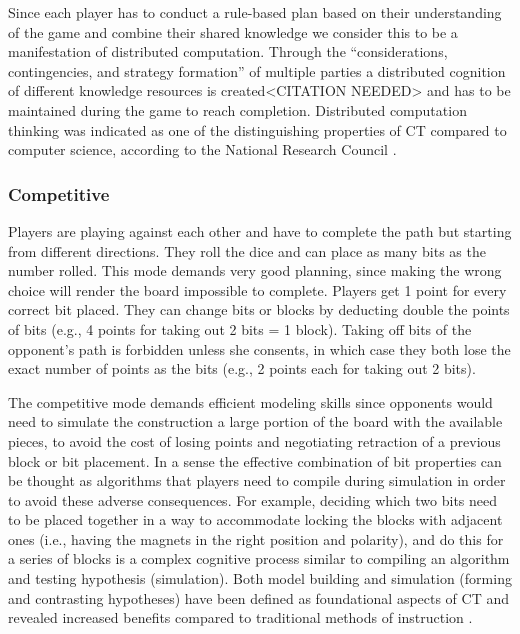 \documentclass{acm_proc_article-sp}
\begin{document}
Since each player has to conduct a rule-based plan based on their understanding of the game and combine their shared knowledge we consider this to be a manifestation of distributed computation. Through the ``considerations, contingencies, and strategy formation'' of multiple parties a distributed cognition of different knowledge resources is created<CITATION NEEDED>\cite{} and has to be maintained during the game to reach completion. Distributed computation thinking was indicated as one of the distinguishing properties of CT compared to computer science, according to the National Research Council \cite{national2010report}.

\subsubsection{Competitive}
Players are playing against each other and have to complete the path but starting from different directions. They roll the dice and can place as many bits as the number rolled. This mode demands very good planning, since making the wrong choice will render the board impossible to complete. Players get 1 point for every correct bit placed. They can change bits or blocks by deducting double the points of bits (e.g., 4 points for taking out 2 bits = 1 block). Taking off bits of the opponent's path is forbidden unless she consents, in which case they both lose the exact number of points as the bits (e.g., 2 points each for taking out 2 bits).

The competitive mode demands efficient modeling skills since opponents would need to simulate the construction a large portion of the board with the available pieces, to avoid the cost of losing points and negotiating retraction of a previous block or bit placement. In a sense the effective combination of bit properties can be thought as algorithms that players need to compile during simulation in order to avoid these adverse consequences. For example, deciding which two bits need to be placed together in a way to accommodate locking the blocks with adjacent ones (i.e., having the magnets in the right position and polarity), and do this for a series of blocks is a complex cognitive process similar to compiling an algorithm and testing hypothesis (simulation). Both model building and simulation (forming and contrasting hypotheses) have been defined as foundational aspects of CT and revealed increased benefits compared to traditional methods of instruction \cite{wilensky2006thinking}.
\end{document}
